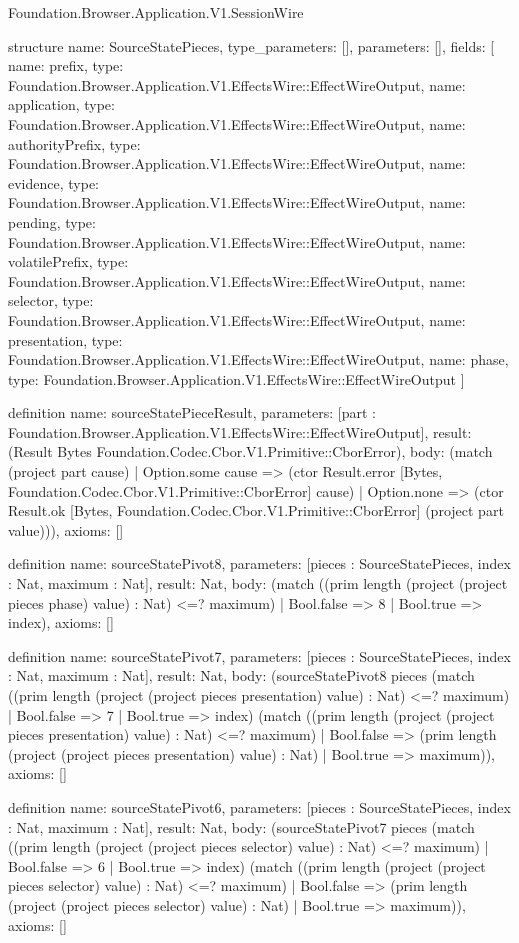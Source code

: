 \begin{lexlean}{Foundation.Browser.Application.V1.SessionWire}
\begin{semanticmodule}
structure{
  name: SourceStatePieces,
  type_parameters: [],
  parameters: [],
  fields: [
    {name: prefix, type: Foundation.Browser.Application.V1.EffectsWire::EffectWireOutput},
    {name: application, type: Foundation.Browser.Application.V1.EffectsWire::EffectWireOutput},
    {name: authorityPrefix, type: Foundation.Browser.Application.V1.EffectsWire::EffectWireOutput},
    {name: evidence, type: Foundation.Browser.Application.V1.EffectsWire::EffectWireOutput},
    {name: pending, type: Foundation.Browser.Application.V1.EffectsWire::EffectWireOutput},
    {name: volatilePrefix, type: Foundation.Browser.Application.V1.EffectsWire::EffectWireOutput},
    {name: selector, type: Foundation.Browser.Application.V1.EffectsWire::EffectWireOutput},
    {name: presentation, type: Foundation.Browser.Application.V1.EffectsWire::EffectWireOutput},
    {name: phase, type: Foundation.Browser.Application.V1.EffectsWire::EffectWireOutput}
  ]
}

definition{
  name: sourceStatePieceResult,
  parameters: [part : Foundation.Browser.Application.V1.EffectsWire::EffectWireOutput],
  result: (Result Bytes Foundation.Codec.Cbor.V1.Primitive::CborError),
  body: (match (project part cause)
    | Option.some cause => (ctor Result.error [Bytes, Foundation.Codec.Cbor.V1.Primitive::CborError] cause)
    | Option.none => (ctor Result.ok [Bytes, Foundation.Codec.Cbor.V1.Primitive::CborError] (project part value))),
  axioms: []
}

definition{
  name: sourceStatePivot8,
  parameters: [pieces : SourceStatePieces, index : Nat, maximum : Nat],
  result: Nat,
  body: (match ((prim length (project (project pieces phase) value) : Nat) <=? maximum)
    | Bool.false => 8
    | Bool.true => index),
  axioms: []
}

definition{
  name: sourceStatePivot7,
  parameters: [pieces : SourceStatePieces, index : Nat, maximum : Nat],
  result: Nat,
  body: (sourceStatePivot8 pieces (match ((prim length (project (project pieces presentation) value) : Nat) <=? maximum)
    | Bool.false => 7
    | Bool.true => index) (match ((prim length (project (project pieces presentation) value) : Nat) <=? maximum)
    | Bool.false => (prim length (project (project pieces presentation) value) : Nat)
    | Bool.true => maximum)),
  axioms: []
}

definition{
  name: sourceStatePivot6,
  parameters: [pieces : SourceStatePieces, index : Nat, maximum : Nat],
  result: Nat,
  body: (sourceStatePivot7 pieces (match ((prim length (project (project pieces selector) value) : Nat) <=? maximum)
    | Bool.false => 6
    | Bool.true => index) (match ((prim length (project (project pieces selector) value) : Nat) <=? maximum)
    | Bool.false => (prim length (project (project pieces selector) value) : Nat)
    | Bool.true => maximum)),
  axioms: []
}


\end{semanticmodule}
\end{lexlean}
